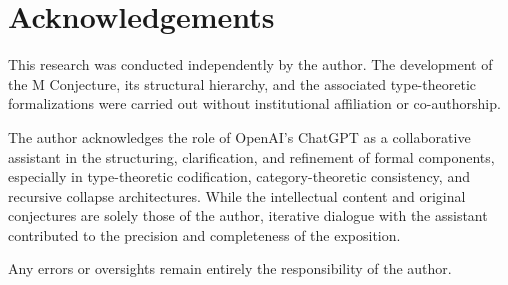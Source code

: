 \documentclass[11pt]{article}
\begin{document}
\FloatBarrier



\section*{Acknowledgements}

This research was conducted independently by the author. The development of the M Conjecture, its structural hierarchy, and the associated type-theoretic formalizations were carried out without institutional affiliation or co-authorship.

The author acknowledges the role of OpenAI’s ChatGPT as a collaborative assistant in the structuring, clarification, and refinement of formal components, especially in type-theoretic codification, category-theoretic consistency, and recursive collapse architectures. While the intellectual content and original conjectures are solely those of the author, iterative dialogue with the assistant contributed to the precision and completeness of the exposition.

Any errors or oversights remain entirely the responsibility of the author.
\end{document}
